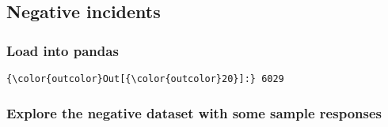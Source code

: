 \documentclass[11pt]{article}
\begin{document}
    \subsection{Negative incidents}\label{negative-incidents}

\subsubsection{Load into pandas}\label{load-into-pandas}



            \begin{Verbatim}[commandchars=\\\{\}]
{\color{outcolor}Out[{\color{outcolor}20}]:} 6029
\end{Verbatim}
        
    \subsubsection{Explore the negative dataset with some sample
responses}\label{explore-the-negative-dataset-with-some-sample-responses}
\end{document}
